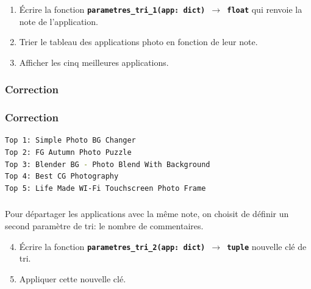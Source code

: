 \documentclass[svgnames,11pt]{beamer}
\begin{document}
\begin{frame}
    \frametitle{}

    \begin{activite}
        \begin{enumerate}
            \item Écrire la fonction \textbf{\texttt{parametres\_tri\_1(app: dict) $\rightarrow$ float}} qui renvoie la note de l'application.
            \item Trier le tableau des applications photo en fonction de leur note.
            \item Afficher les cinq meilleures applications.
        \end{enumerate}
    \end{activite}

\end{frame}
\begin{frame}
    \frametitle{Correction}




\end{frame}
\begin{frame}[fragile]
    \frametitle{Correction}
    
\begin{center}
\begin{lstlisting}[language=bash]
Top 1: Simple Photo BG Changer
Top 2: FG Autumn Photo Puzzle
Top 3: Blender BG - Photo Blend With Background
Top 4: Best CG Photography
Top 5: Life Made WI-Fi Touchscreen Photo Frame 
\end{lstlisting}
\end{center}

\end{frame}
\begin{frame}
    \frametitle{}
\setcounter{compteuractivite}{5}
    \begin{activite}
        Pour départager les applications avec la même note, on choisit de définir un second paramètre de tri: le nombre de commentaires.
        \begin{enumerate}
            \setcounter{enumi}{3}
            \item Écrire la fonction \textbf{\texttt{parametres\_tri\_2(app: dict) $\rightarrow$ tuple}} nouvelle clé de tri.
            \item Appliquer cette nouvelle clé.
        \end{enumerate}
    \end{activite}

\end{frame}
\end{document}
